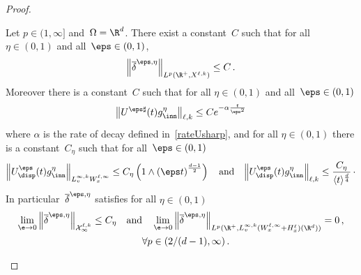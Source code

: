 \begin{proof}
\begin{lemm}\label{resultstildegeps}
Let $p \in (1, \infty]$ and~$\Omega = \R^d$. There exist a constant~$C$ such that for all $\eta \in (0,1)$ and all~$\eps \in (0,1)$,
\begin{equation}\label{estimateLpXtildeg}
\left\|\overline\delta^{\eps,\eta} \right\|_{L^p(\R^+,{X}^{\ell,k})}
\leq C\,.
\end{equation}
Moreover there is a constant~$C$ such that for all $\eta \in (0,1)$ and all~$\eps \in (0,1)$
\begin{equation}\label{estimatedelta2}
\left\| U^{\eps \sharp}(t)g^\eta_{\inn}
\right\|_{\ell,k} \leq C e^{-\alpha \frac{t}{\eps^2}}
\end{equation}
where $\alpha$ is the rate of decay defined in~\eqref{rateUsharp}, and for all $\eta \in (0,1)$ there is a constant~$C_\eta$ such that for all~$\eps \in (0,1)$
\begin{equation}\label{estimatedelta1}
\left\|U^\eps_{\disp}(t) g^\eta_{\inn} \right\|_{L^{\infty,k}_v W^{\ell,\infty}_x} \leq C_\eta\left(1 \wedge \left(\eps t \right)^{\frac{d-1}{2}} \right)
\quad \text{and} \quad {\left\|U^\eps_{\disp}(t) g^\eta_{\inn} \right\|_{\ell,k} \le \frac{C_\eta}{\langle t \rangle^\frac d4}} \, \cdotp
\end{equation}
In particular~$\overline\delta^{\eps,\eta}$ satisfies for all $\eta \in (0,1)$
\begin{multline*}
\lim_{\e\to0} \left\|\overline\delta^{\eps,\eta}\right\|_{\mathcal{X}^{\ell,k}_\infty} \le C_\eta
\quad\text{and}\quad \lim_{\e\to0}\left\|\overline\delta^{\eps,\eta}\right\|_{L^p(\R^+,L^{\infty,k}_v(W^{\ell,\infty}_x{+ H^\ell_x})(\R^d))} = 0\,,\\ \quad \forall p \in ({2}/{(d-1)}, \infty) \,.
\end{multline*}
\end{lemm}



\end{proof}
